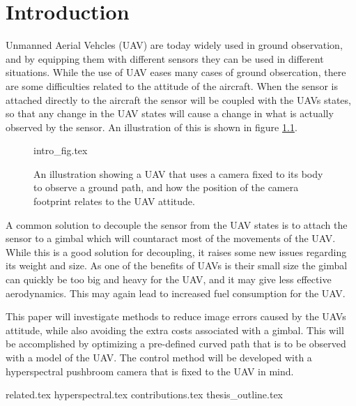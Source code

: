 \chapter{Introduction}

Unmanned Aerial Vehcles (UAV) are today widely used in ground observation, and by equipping them with different sensors they can be used in different situations. While the use of UAV eases many cases of ground obsercation, there are some difficulties related to the attitude of the aircraft. When the sensor is attached directly to the aircraft the sensor will be coupled with the UAVs states, so that any change in the UAV states will cause a change in what is actually observed by the sensor. An illustration of this is shown in figure \ref{fig:intro_fig}.

\begin{figure}
	{intro_fig.tex}
	\caption{An illustration showing a UAV that uses a camera fixed to its body to observe a ground path, and how the position of the camera footprint relates to the UAV attitude.}
	\label{fig:intro_fig}
\end{figure}

A common solution to decouple the sensor from the UAV states is to attach the sensor to a gimbal which will countaract most of the movements of the UAV. While this is a good solution for decoupling, it raises some new issues regarding its weight and size. As one of the benefits of UAVs is their small size the gimbal can quickly be too big and heavy for the UAV, and it may give less effective aerodynamics. This may again lead to increased fuel consumption for the UAV.

This paper will investigate methods to reduce image errors caused by the UAVs attitude, while also avoiding the extra costs associated with a gimbal. This will be accomplished by optimizing a pre-defined curved path that is to be observed with a model of the UAV. The control method will be developed with a hyperspectral pushbroom camera that is fixed to the UAV in mind.


{related.tex}
{hyperspectral.tex}
{contributions.tex}
{thesis_outline.tex}